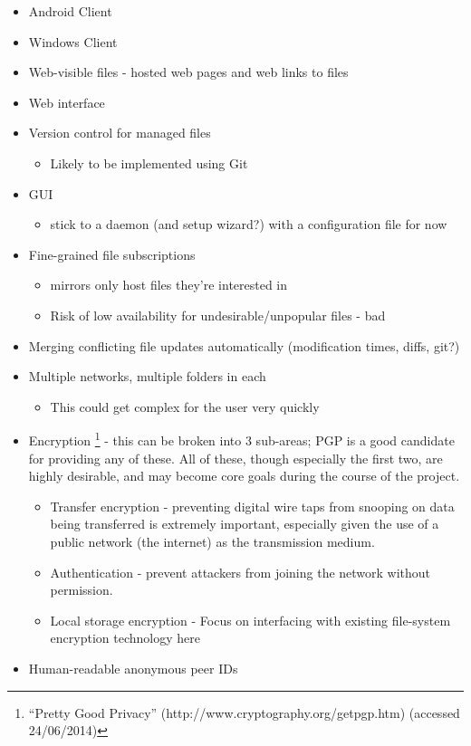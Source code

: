 \documentclass[12pt,a4paper,]{adreport}
\begin{document}
\begin{itemize}
\item
  Android Client
\item
  Windows Client
\item
  Web-visible files - hosted web pages and web links to files
\item
  Web interface
\item
  Version control for managed files

  \begin{itemize}
  \itemsep1pt\parskip0pt
  \item
    Likely to be implemented using Git
  \end{itemize}
\item
  GUI

  \begin{itemize}
  \itemsep1pt\parskip0pt
  \item
    stick to a daemon (and setup wizard?) with a configuration file for
    now
  \end{itemize}
\item
  Fine-grained file subscriptions

  \begin{itemize}
  \itemsep1pt\parskip0pt
  \item
    mirrors only host files they're interested in
  \item
    Risk of low availability for undesirable/unpopular files - bad
  \end{itemize}
\item
  Merging conflicting file updates automatically (modification times,
  diffs, git?)
\item
  Multiple networks, multiple folders in each

  \begin{itemize}
  \itemsep1pt\parskip0pt
  \item
    This could get complex for the user very quickly
  \end{itemize}
\item
  Encryption \footnote{``Pretty Good Privacy''
    (http://www.cryptography.org/getpgp.htm) (accessed 24/06/2014)} -
  this can be broken into 3 sub-areas; PGP is a good candidate for
  providing any of these. All of these, though especially the first two,
  are highly desirable, and may become core goals during the course of
  the project.

  \begin{itemize}
  \itemsep1pt\parskip0pt
  \item
    Transfer encryption - preventing digital wire taps from snooping on
    data being transferred is extremely important, especially given the
    use of a public network (the internet) as the transmission medium.
  \item
    Authentication - prevent attackers from joining the network without
    permission.
  \item
    Local storage encryption - Focus on interfacing with existing
    file-system encryption technology here
  \end{itemize}
\item
  Human-readable anonymous peer IDs


\end{itemize}
\end{document}
